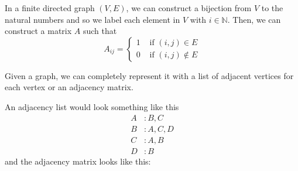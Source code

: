 \documentclass{article}
\begin{document}
    \begin{definition}
      In a finite directed graph $(V, E)$, we can construct a bijection from $V$ to the natural numbers and so we label each element in $V$ with $i \in \mathbb{N}$. Then, we can construct a matrix $A$ such that 
      \begin{equation}
        A_{ij} = \begin{cases} 1 & \text{ if } (i, j) \in E \\ 0 & \text{ if } (i, j) \not\in E \end{cases}
      \end{equation}
    \end{definition}

    \begin{example}
      Given a graph, we can completely represent it with a list of adjacent vertices for each vertex or an adjacency matrix. 
      \begin{center}
      \end{center}
      An adjacency list would look something like this 
      \[
      \begin{aligned}
      A &: B, C \\
      B &: A, C, D \\
      C &: A, B \\
      D &: B
      \end{aligned}
      \]
      and the adjacency matrix looks like this: 
      \begin{center}
      \end{center}
    \end{example}
\end{document}
